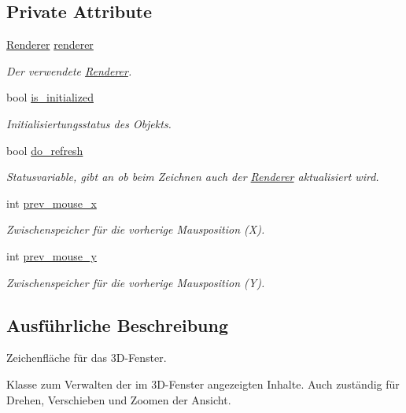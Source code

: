 \subsection*{Private Attribute}
\begin{DoxyCompactItemize}
\item 
\hyperlink{classRenderer}{Renderer} \hyperlink{classGUIGLCanvas_a33a4ad3bc364d697396c55d011bfac44}{renderer}
\begin{DoxyCompactList}\small\item\em Der verwendete \hyperlink{classRenderer}{Renderer}. \end{DoxyCompactList}\item 
bool \hyperlink{classGUIGLCanvas_a59e01564652765dec69e7097c10b4455}{is\-\_\-initialized}
\begin{DoxyCompactList}\small\item\em Initialisiertungsstatus des Objekts. \end{DoxyCompactList}\item 
bool \hyperlink{classGUIGLCanvas_a7139f37aa028f71e393a0c479299455d}{do\-\_\-refresh}
\begin{DoxyCompactList}\small\item\em Statusvariable, gibt an ob beim Zeichnen auch der \hyperlink{classRenderer}{Renderer} aktualisiert wird. \end{DoxyCompactList}\item 
int \hyperlink{classGUIGLCanvas_afc22c47a62b8d5b165a22d059816ee22}{prev\-\_\-mouse\-\_\-x}
\begin{DoxyCompactList}\small\item\em Zwischenspeicher für die vorherige Mausposition (X). \end{DoxyCompactList}\item 
int \hyperlink{classGUIGLCanvas_a684c82bd591f01b5f600c9589158e0e0}{prev\-\_\-mouse\-\_\-y}
\begin{DoxyCompactList}\small\item\em Zwischenspeicher für die vorherige Mausposition (Y). \end{DoxyCompactList}\end{DoxyCompactItemize}


\subsection{Ausführliche Beschreibung}
Zeichenfläche für das 3\-D-\/\-Fenster. 

Klasse zum Verwalten der im 3\-D-\/\-Fenster angezeigten Inhalte. Auch zuständig für Drehen, Verschieben und Zoomen der Ansicht. 

